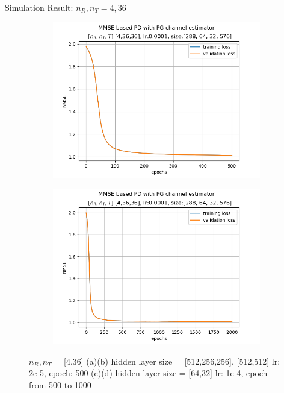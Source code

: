 \documentclass[hyperref={bookmarks=false}]{beamer}
\numberwithin{figure}{section}
\begin{document}
\begin{frame}{Simulation Result: $n_R, n_T = 4, 36$}
\begin{figure}[h!]
\begin{subfigure}[b]{0.33\linewidth}
    \end{subfigure}
    \begin{subfigure}[b]{0.33\linewidth}
      \includegraphics[width=\linewidth]{figures/240502/figure_1_0.0001_[288, 64, 32, 576]_ep500.png}
    \end{subfigure}
    \begin{subfigure}[b]{0.33\linewidth}
      \includegraphics[width=\linewidth]{figures/240502/figure_1_lr0.0001_[288, 64, 32, 576]_ep2000.png}
    \end{subfigure}
    \caption{$n_R, n_T$ = [4,36] 
        (a)(b) hidden layer size = [512,256,256], [512,512] lr: 2e-5, epoch: 500
        (c)(d) hidden layer size = [64,32] lr: 1e-4, epoch from 500 to 1000}
    \label{fig:4_36}
\end{figure}

\end{frame}
\end{document}

